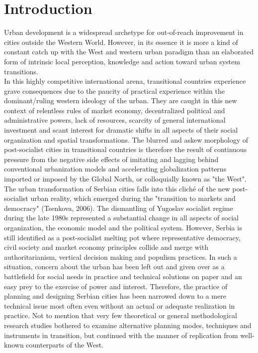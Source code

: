 \documentclass[11pt]{report}
\begin{document}

\chapter{Introduction}

Urban development is a widespread archetype for out-of-reach improvement in cities outside the Western World. However, in its essence it is more a kind of constant catch up with the West and western urban paradigm than an elaborated form of intrinsic local perception, knowledge and action toward urban system transitions. 
\\
In this highly competitive international arena, transitional countries experience grave consequences due to the paucity of practical experience within the dominant/ruling western ideology of the urban. They are caught in this new context of relentless rules of market economy, decentralized political and administrative powers, lack of resources, scarcity of general international investment and scant interest for dramatic shifts in all aspects of their social organization and spatial transformations. The blurred and askew morphology of post-socialist cities in transitional countries is therefore the result of continuous pressure from the negative side effects of imitating and lagging behind conventional urbanization models and accelerating globalization patterns imported or imposed by the Global North, or colloquially known as "the West".
\\
The urban transformation of Serbian cities falls into this cliché of the new post-socialist urban reality, which emerged during the "transition to markets and democracy" (Tsenkova, 2006). The dismantling of Yugoslav socialist regime during the late 1980s represented a substantial change in all aspects of social organization, the economic model and the political system. However, Serbia is still identified as a post-socialist melting pot where representative democracy, civil society and market economy principles collide and merge with authoritarianism, vertical decision making and populism practices. In such a situation, concern about the urban has been left out and given over as a battlefield for social needs in practice and technical solutions on paper and an easy prey to the exercise of power and interest. Therefore, the practice of planning and designing Serbian cities has been narrowed down to a mere technical issue most often even without an actual or adequate realization in practice. Not to mention that very few theoretical or general methodological research studies bothered to examine alternative planning modes, techniques and instruments in transition, but continued with the manner of replication from well-known counterparts of the West.
\end{document}

